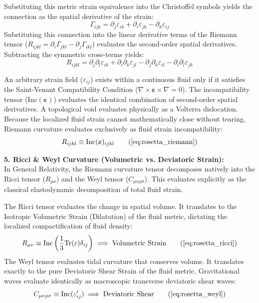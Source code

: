 \documentclass[11pt, a4paper]{article}
\begin{document}
Substituting this metric strain equivalence into the Christoffel symbols yields the connection as the spatial derivative of the strain:
\begin{equation}
    \Gamma_{ijk} = \partial_j \varepsilon_{ik} + \partial_i \varepsilon_{jk} - \partial_k \varepsilon_{ij} 
\end{equation}
Substituting this connection into the linear derivative terms of the Riemann tensor ($R_{ijkl} = \partial_i \Gamma_{jkl} - \partial_j \Gamma_{ikl}$) evaluates the second-order spatial derivatives. Subtracting the symmetric cross-terms yields:
\begin{equation}
    R_{ijkl} = \partial_j \partial_l \varepsilon_{ik} + \partial_i \partial_k \varepsilon_{jl} - \partial_j \partial_k \varepsilon_{il} - \partial_i \partial_l \varepsilon_{jk} \nonumber
\end{equation}

An arbitrary strain field ($\varepsilon_{ij}$) exists within a continuous fluid only if it satisfies the Saint-Venant Compatibility Condition ($\nabla \times \boldsymbol{\varepsilon} \times \nabla = 0$). The incompatibility tensor ($\text{Inc}(\boldsymbol{\varepsilon})$) evaluates the identical combination of second-order spatial derivatives. A topological void evaluates physically as a Volterra dislocation. Because the localized fluid strain cannot mathematically close without tearing, Riemann curvature evaluates exclusively as fluid strain incompatibility:
\begin{equation}
    R_{ijkl} \equiv \text{Inc}(\boldsymbol{\varepsilon})_{ijkl} \tag{\ref{eq:rosetta_riemann}}
\end{equation}

\textbf{5. Ricci \& Weyl Curvature (Volumetric vs. Deviatoric Strain):} \\
In General Relativity, the Riemann curvature tensor decomposes natively into the Ricci tensor ($R_{\mu\nu}$) and the Weyl tensor ($C_{\mu\nu\rho\sigma}$). This evaluates explicitly as the classical elastodynamic decomposition of total fluid strain.

The Ricci tensor evaluates the change in spatial volume. It translates   to the Isotropic Volumetric Strain (Dilatation) of the fluid metric, dictating the localized compactification of fluid density:
\begin{equation}
    R_{\mu\nu} \equiv \text{Inc}\left(\frac{1}{3}\text{Tr}(\varepsilon)\delta_{ij}\right) \implies \text{Volumetric Strain} \tag{\ref{eq:rosetta_ricci}}
\end{equation}
The Weyl tensor evaluates tidal curvature that   conserves volume. It translates exactly to the pure Deviatoric Shear Strain of the fluid metric. Gravitational waves evaluate identically as macroscopic transverse deviatoric shear waves:
\begin{equation}
    C_{\mu\nu\rho\sigma} \equiv \text{Inc}(\varepsilon'_{ij}) \implies \text{Deviatoric Shear} \tag{\ref{eq:rosetta_weyl}}
\end{equation}
\end{document}
